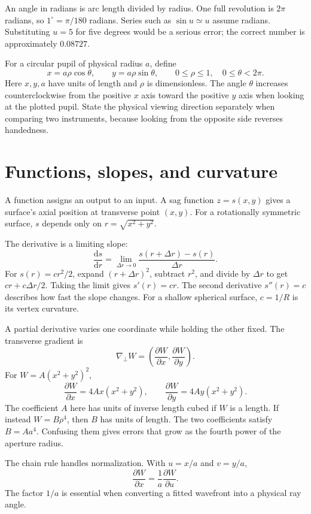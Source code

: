 An angle in radians is arc length divided by radius. One full revolution is $2\pi$ radians, so $1^\circ=\pi/180$ radians. Series such as $\sin u\simeq u$ assume radians. Substituting $u=5$ for five degrees would be a serious error; the correct number is approximately $0.08727$.

For a circular pupil of physical radius $a$, define
\begin{equation}
x=a\rho\cos\theta,\qquad y=a\rho\sin\theta,
\qquad 0\leq\rho\leq1,\quad 0\leq\theta<2\pi.
\label{fnd:pupilcoords}
\end{equation}
Here $x,y,a$ have units of length and $\rho$ is dimensionless. The angle $\theta$ increases counterclockwise from the positive $x$ axis toward the positive $y$ axis when looking at the plotted pupil. State the physical viewing direction separately when comparing two instruments, because looking from the opposite side reverses handedness.

\section{Functions, slopes, and curvature}
A function assigns an output to an input. A sag function $z=s(x,y)$ gives a surface's axial position at transverse point $(x,y)$. For a rotationally symmetric surface, $s$ depends only on $r=\sqrt{x^2+y^2}$.

The derivative is a limiting slope:
\[
\frac{\mathrm{d}s}{\mathrm{d}r}
=\lim_{\Delta r\to0}\frac{s(r+\Delta r)-s(r)}{\Delta r}.
\]
For $s(r)=cr^2/2$, expand $(r+\Delta r)^2$, subtract $r^2$, and divide by $\Delta r$ to get $cr+c\Delta r/2$. Taking the limit gives $s'(r)=cr$. The second derivative $s''(r)=c$ describes how fast the slope changes. For a shallow spherical surface, $c=1/R$ is its vertex curvature.

A partial derivative varies one coordinate while holding the other fixed. The transverse gradient is
\[
\nabla_\perp W=
\left(\frac{\partial W}{\partial x},\frac{\partial W}{\partial y}\right).
\]
For $W=A(x^2+y^2)^2$,
\[
\frac{\partial W}{\partial x}=4Ax(x^2+y^2),\qquad
\frac{\partial W}{\partial y}=4Ay(x^2+y^2).
\]
The coefficient $A$ here has units of inverse length cubed if $W$ is a length. If instead $W=B\rho^4$, then $B$ has units of length. The two coefficients satisfy $B=Aa^4$. Confusing them gives errors that grow as the fourth power of the aperture radius.

The chain rule handles normalization. With $u=x/a$ and $v=y/a$,
\[
\frac{\partial W}{\partial x}
=\frac{1}{a}\frac{\partial W}{\partial u}.
\]
The factor $1/a$ is essential when converting a fitted wavefront into a physical ray angle.

